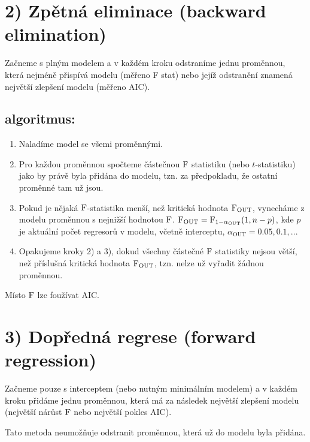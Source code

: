 \section*{2) Zpětná eliminace (backward elimination)}
Začneme s plným modelem a v každém kroku odstraníme jednu proměnnou, která nejméně přispívá modelu (měřeno F stat) nebo jejíž odstranění znamená největší zlepšení modelu (měřeno AIC).
\subsection*{algoritmus:}\begin{enumerate}[	1)]
	\item Naladíme model se všemi proměnnými.
	\item Pro každou proměnnou spočteme částečnou $\mathrm{F}$ statistiku (nebo $t$-statistiku) jako by právě byla přidána do modelu, tzn. za předpokladu, že ostatní proměnné tam už jsou.
	\item Pokud je nějaká $\mathrm{F}$-statistika menší, než kritická hodnota $\mathrm{F}_\mathrm{OUT}$, vynecháme z modelu proměnnou s nejnižší hodnotou $\mathrm{F}$. $\mathrm{F}_\mathrm{OUT}=\mathrm{F}_{1-\alpha_\mathrm{OUT}}(1,n-p)$, kde $p$ je aktuální počet regresorů v modelu, včetně interceptu, $\alpha_\text{OUT}=0.05,0.1,...$
	\item Opakujeme kroky 2) a 3), dokud všechny částečné $\mathrm{F}$ statistiky nejsou větší, než příslušná kritická hodnota $\mathrm{F}_\mathrm{OUT}$, tzn. nelze už vyřadit žádnou proměnnou.
\end{enumerate}
\begin{remark}
	Místo $\mathrm{F}$ lze foužívat AIC.
\end{remark}

\section*{3) Dopředná regrese (forward regression)}
Začneme pouze s interceptem (nebo nutným minimálním modelem) a v každém kroku přidáme jednu proměnnou, která má za následek největší zlepšení modelu (největší nárůst $\mathrm{F}$ nebo největší pokles AIC). 

Tato metoda neumožňuje odstranit proměnnou, která už do modelu byla přidána.

